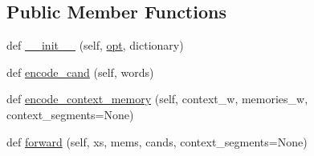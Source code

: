 \subsection*{Public Member Functions}
\begin{DoxyCompactItemize}
\item 
def \hyperlink{classparlai_1_1agents_1_1transformer_1_1modules_1_1TransformerMemNetModel_a0b1598bb8f1a8b899c00af25044ffe9c}{\+\_\+\+\_\+init\+\_\+\+\_\+} (self, \hyperlink{classparlai_1_1agents_1_1transformer_1_1modules_1_1TransformerMemNetModel_a293a7995da2bc66087db07ba4669fb35}{opt}, dictionary)
\item 
def \hyperlink{classparlai_1_1agents_1_1transformer_1_1modules_1_1TransformerMemNetModel_a1e39cdf6357c9e8dd9f90e7f351e42a1}{encode\+\_\+cand} (self, words)
\item 
def \hyperlink{classparlai_1_1agents_1_1transformer_1_1modules_1_1TransformerMemNetModel_a12c6c4a26be5401e61c43ec4aa886812}{encode\+\_\+context\+\_\+memory} (self, context\+\_\+w, memories\+\_\+w, context\+\_\+segments=None)
\item 
def \hyperlink{classparlai_1_1agents_1_1transformer_1_1modules_1_1TransformerMemNetModel_a8c27f924c01b5017c7968b9d98969496}{forward} (self, xs, mems, cands, context\+\_\+segments=None)
\end{DoxyCompactItemize}
